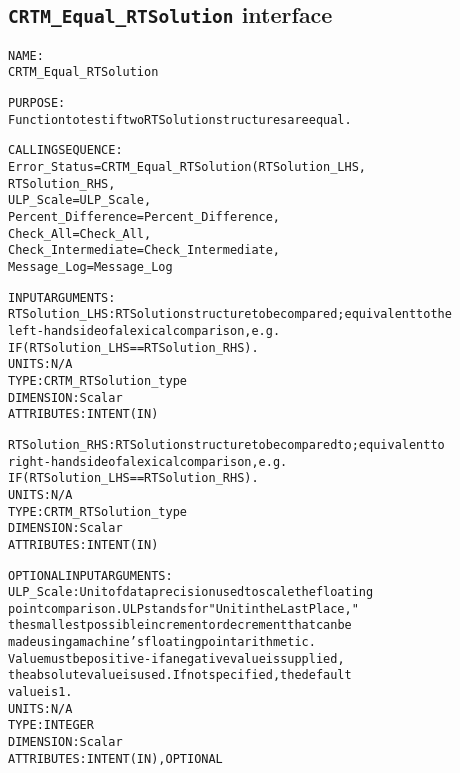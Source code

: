 \subsection{\texttt{CRTM\_Equal\_RTSolution} interface}
  \label{sec:CRTM_Equal_RTSolution_interface}
  \begin{alltt}
 
  NAME:
        CRTM_Equal_RTSolution
 
  PURPOSE:
        Function to test if two RTSolution structures are equal.
 
  CALLING SEQUENCE:
        Error_Status = CRTM_Equal_RTSolution( RTSolution_LHS                       , 
                                              RTSolution_RHS                       , 
                                              ULP_Scale         =ULP_Scale         , 
                                              Percent_Difference=Percent_Difference, 
                                              Check_All         =Check_All         , 
                                              Check_Intermediate=Check_Intermediate, 
                                              Message_Log       =Message_Log         
 
 
  INPUT ARGUMENTS:
        RTSolution_LHS:     RTSolution structure to be compared; equivalent to the
                            left-hand side of a lexical comparison, e.g.
                              IF ( RTSolution_LHS == RTSolution_RHS ).
                            UNITS:      N/A
                            TYPE:       CRTM_RTSolution_type
                            DIMENSION:  Scalar
                            ATTRIBUTES: INTENT(IN)
 
        RTSolution_RHS:     RTSolution structure to be compared to; equivalent to
                            right-hand side of a lexical comparison, e.g.
                              IF ( RTSolution_LHS == RTSolution_RHS ).
                            UNITS:      N/A
                            TYPE:       CRTM_RTSolution_type
                            DIMENSION:  Scalar
                            ATTRIBUTES: INTENT(IN)
 
  OPTIONAL INPUT ARGUMENTS:
        ULP_Scale:          Unit of data precision used to scale the floating
                            point comparison. ULP stands for "Unit in the Last Place,"
                            the smallest possible increment or decrement that can be
                            made using a machine's floating point arithmetic.
                            Value must be positive - if a negative value is supplied,
                            the absolute value is used. If not specified, the default
                            value is 1.
                            UNITS:      N/A
                            TYPE:       INTEGER
                            DIMENSION:  Scalar
                            ATTRIBUTES: INTENT(IN), OPTIONAL
 

\end{alltt}
